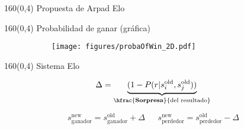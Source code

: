 \documentclass[shownotes,aspectratio=169]{beamer}
\begin{document}
\begin{frame}[plain]
\begin{textblock}{160}(0,4)
\centering  \Large 
Propuesta de Arpad Elo
 \end{textblock}
 

\end{frame}


\begin{frame}[plain]
\begin{textblock}{160}(0,4)
\centering  \Large 
Probabilidad de ganar (gr\'afica)
 \end{textblock}
\vspace{0.75cm}
 
\begin{figure}[H]     
     \centering
     \begin{subfigure}[b]{0.55\textwidth}
       \texttt{[image: figures/probaOfWin\_2D.pdf]} 
     \end{subfigure}
\end{figure}
  
\end{frame}
 
\begin{frame}[plain]
\begin{textblock}{160}(0,4)
\centering \Large
Sistema Elo 
\end{textblock}
\vspace{0.75cm}

\begin{equation*}
 \Delta = \underbrace{(1 - P(r|s_i^{\text{old}},s_j^{\text{old}}))}_{\hfrac{\textbf{Sorpresa}}{\text{del resultado}}}
\end{equation*}

\vspace{0.5cm}

\pause

\begin{equation*}
s_\text{ganador}^{\text{new}} = s_\text{ganador}^{\text{old}} + \Delta \ \ \ \ \ \ \  s_\text{perdedor}^{\text{new}} = s_\text{perdedor}^{\text{old}} - \Delta
\end{equation*}

\pause
\vspace{0.5cm}

\begin{center}
\end{center}


\end{frame}
\end{document}
